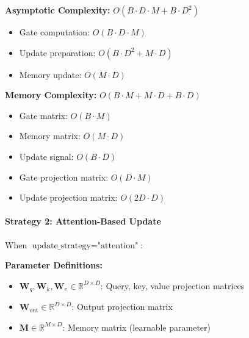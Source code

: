 \documentclass{article}
\begin{document}
\begin{enumerate}
\textbf{Asymptotic Complexity:} $O(B \cdot D \cdot M + B \cdot D^2)$
\begin{itemize}
\item Gate computation: $O(B \cdot D \cdot M)$
\item Update preparation: $O(B \cdot D^2 + M \cdot D)$
\item Memory update: $O(M \cdot D)$
\end{itemize}

\textbf{Memory Complexity:} $O(B \cdot M + M \cdot D + B \cdot D)$
\begin{itemize}
\item Gate matrix: $O(B \cdot M)$
\item Memory matrix: $O(M \cdot D)$
\item Update signal: $O(B \cdot D)$
\item Gate projection matrix: $O(D \cdot M)$
\item Update projection matrix: $O(2D \cdot D)$
\end{itemize}
\end{enumerate}

\paragraph{Strategy 2: Attention-Based Update}

When $\text{update\_strategy} = \text{"attention"}$:

\textbf{Parameter Definitions:}
\begin{itemize}
\item $\mathbf{W}_q, \mathbf{W}_k, \mathbf{W}_v \in \mathbb{R}^{D \times D}$: Query, key, value projection matrices
\item $\mathbf{W}_{\text{out}} \in \mathbb{R}^{D \times D}$: Output projection matrix
\item $\mathbf{M} \in \mathbb{R}^{M \times D}$: Memory matrix (learnable parameter)
\end{itemize}
\end{document}
